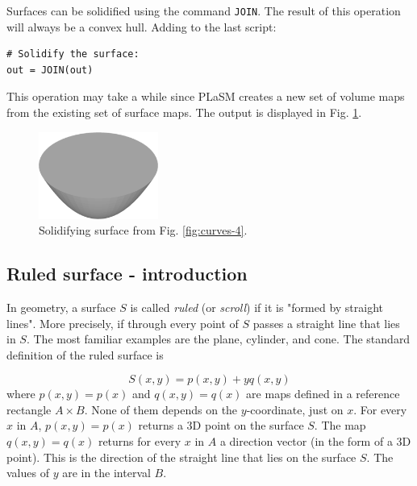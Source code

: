 Surfaces can be solidified using the command {\tt JOIN}. The 
result of this operation will always be a convex hull. 
Adding to the last script:\\

\begin{bbox}
\begin{verbatim}
# Solidify the surface:
out = JOIN(out)
\end{verbatim}
\end{bbox}
\vspace{6mm}

\noindent
This operation may take a while since PLaSM creates a new 
set of volume maps from the existing set of surface maps. 
The output is displayed in Fig. \ref{fig:curves-5}.

\begin{figure}[!ht]
\begin{center}
\includegraphics[width=0.35\textwidth]{img/curves-5.png}
\end{center}
\vspace{-4mm}
\caption{Solidifying surface from Fig. \ref{fig:curves-4}.}
\label{fig:curves-5}
\vspace{-1cm}
\end{figure}
\newpage

\subsection{Ruled surface - introduction}

In geometry, a surface $S$ is called {\em ruled} (or {\em scroll}) if it is "formed by straight lines".
More precisely, if through every point of $S$ passes a straight line that lies in $S$. 
The most familiar examples are the plane, cylinder, and 
cone. The standard definition of the ruled surface is 

$$
S(x, y) = p(x, y) + yq(x, y)
$$
where $p(x, y) = p(x)$ and $q(x, y) = q(x)$ are maps defined in a reference rectangle 
$A \times B$. None of them depends on the $y$-coordinate, just on $x$. For every $x$ in 
$A$, $p(x, y) = p(x)$ returns a 3D point on the surface $S$. The map $q(x, y) = q(x)$ returns 
for every $x$ in $A$ a direction vector (in the form of a 3D point). This is the direction 
of the straight line that lies on the surface $S$. The values of $y$ are in the interval $B$.

